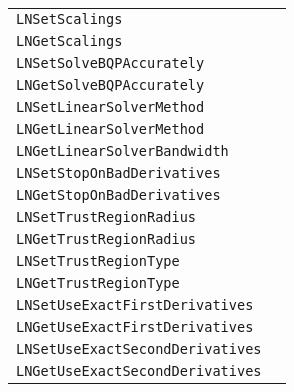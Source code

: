 \documentclass[12pt]{article}
\begin{document}
\newpage
\begin{center}
\begin{tabular}{ll}
\tt LNSetScalings&\pageref{Subroutine:LNSetScalings}\\
\tt LNGetScalings&\pageref{Subroutine:LNGetScalings}\\
\tt LNSetSolveBQPAccurately&\pageref{Subroutine:LNSetSolveBQPAccurately}\\
\tt LNGetSolveBQPAccurately&\pageref{Subroutine:LNGetSolveBQPAccurately}\\
\tt LNSetLinearSolverMethod&\pageref{Subroutine:LNSetLinearSolverMethod}\\
\tt LNGetLinearSolverMethod&\pageref{Subroutine:LNGetLinearSolverMethod}\\
\tt LNGetLinearSolverBandwidth&\pageref{Subroutine:LNGetLinearSolverBandwidth}\\
\tt LNSetStopOnBadDerivatives&\pageref{Subroutine:LNSetStopOnBadDerivatives}\\
\tt LNGetStopOnBadDerivatives&\pageref{Subroutine:LNGetStopOnBadDerivatives}\\
\tt LNSetTrustRegionRadius&\pageref{Subroutine:LNSetTrustRegionRadius}\\
\tt LNGetTrustRegionRadius&\pageref{Subroutine:LNGetTrustRegionRadius}\\
\tt LNSetTrustRegionType&\pageref{Subroutine:LNSetTrustRegionType}\\
\tt LNGetTrustRegionType&\pageref{Subroutine:LNGetTrustRegionType}\\
\tt LNSetUseExactFirstDerivatives&\pageref{Subroutine:LNSetUseExactFirstDerivatives}\\
\tt LNGetUseExactFirstDerivatives&\pageref{Subroutine:LNGetUseExactFirstDerivatives}\\
\tt LNSetUseExactSecondDerivatives&\pageref{Subroutine:LNSetUseExactSecondDerivatives}\\
\tt LNGetUseExactSecondDerivatives&\pageref{Subroutine:LNGetUseExactSecondDerivatives}\\
\end{tabular}
\end{center}


\end{document}
